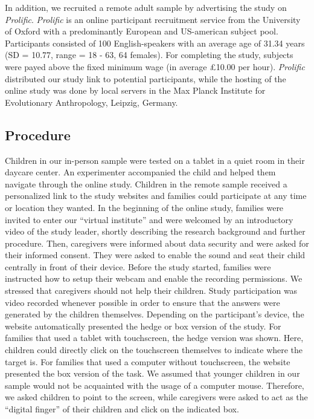 \documentclass[
  man,floatsintext]{apa6}
\begin{document}
In addition, we recruited a remote adult sample by advertising the study on \emph{Prolific}. \emph{Prolific} is an online participant recruitment service from the University of Oxford with a predominantly European and US-american subject pool. Participants consisted of 100 English-speakers with an average age of 31.34 years (SD = 10.77, range = 18 - 63, 64 females).
For completing the study, subjects were payed above the fixed minimum wage (in average £10.00 per hour). \emph{Prolific} distributed our study link to potential participants, while the hosting of the online study was done by local servers in the Max Planck Institute for Evolutionary Anthropology, Leipzig, Germany.

\hypertarget{procedure}{%
\subsection{Procedure}\label{procedure}}

Children in our in-person sample were tested on a tablet in a quiet room in their daycare center. An experimenter accompanied the child and helped them navigate through the online study.
Children in the remote sample received a personalized link to the study websites and families could participate at any time or location they wanted. In the beginning of the online study, families were invited to enter our ``virtual institute'' and were welcomed by an introductory video of the study leader, shortly describing the research background and further procedure. Then, caregivers were informed about data security and were asked for their informed consent. They were asked to enable the sound and seat their child centrally in front of their device. Before the study started, families were instructed how to setup their webcam and enable the recording permissions. We stressed that caregivers should not help their children. Study participation was video recorded whenever possible in order to ensure that the answers were generated by the children themselves.
Depending on the participant's device, the website automatically presented the hedge or box version of the study. For families that used a tablet with touchscreen, the hedge version was shown. Here, children could directly click on the touchscreen themselves to indicate where the target is. For families that used a computer without touchscreen, the website presented the box version of the task. We assumed that younger children in our sample would not be acquainted with the usage of a computer mouse. Therefore, we asked children to point to the screen, while caregivers were asked to act as the ``digital finger'' of their children and click on the indicated box.
\end{document}
